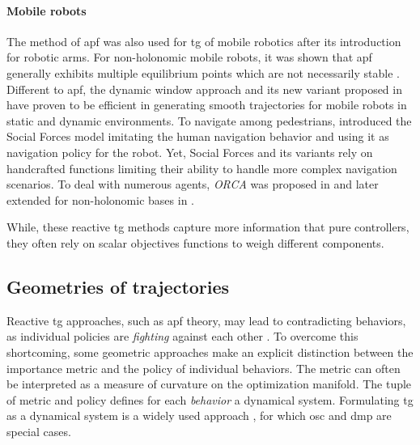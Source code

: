 \paragraph{Mobile robots}

The method of \ac{apf} was also used for \ac{tg} of mobile
robotics after its introduction for robotic arms.
For non-holonomic mobile robots, it was shown that \ac{apf}
generally exhibits multiple equilibrium points which are not
necessarily stable \cite{urakubo2018stability}.
Different to \ac{apf}, the dynamic window approach
\cite{Fox1997} and its new variant proposed in
\cite{Zhang2019} have proven to be efficient in generating
smooth trajectories for mobile robots in static and dynamic
environments. To navigate among pedestrians,
\cite{Ferrer2013} introduced the Social Forces model
imitating the human navigation behavior and using it as
navigation policy for the robot.  Yet, Social Forces and its
variants rely on handcrafted functions limiting their
ability to handle more complex navigation scenarios. To deal
with numerous agents, \textit{ORCA} was proposed in
\cite{VanDenBerg2011} and later extended for non-holonomic
bases in \cite{Alonso-Mora2012a}.


While, these reactive \ac{tg} methods capture more
information that pure controllers, they often rely on 
scalar objectives functions to weigh different components.

\subsection{Geometries of trajectories}
\label{sec:geometries_of_trajectories}

Reactive \ac{tg} approaches, such as \ac{apf} theory,
may lead to contradicting behaviors, as individual policies
are \textit{fighting} against each other \cite{Ratliff2018}.
To overcome this shortcoming, some geometric approaches make
an explicit distinction between the importance metric and
the policy of individual behaviors. The metric can often be
interpreted as a measure of curvature on the optimization
manifold. The tuple of metric and policy defines
for each \textit{behavior} a dynamical system.
Formulating \ac{tg} as a dynamical system is a widely used
approach
\cite{khansari2012dynamical,huber2023avoidance}, for which
\ac{osc} \cite{Khatib1987a} and \ac{dmp}
\cite{ijspeert2013dynamical} are special cases.
%

